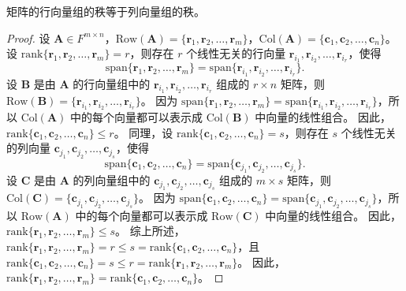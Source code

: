 \begin{proposition}
    矩阵的行向量组的秩等于列向量组的秩。
    \label{prop:row_col_rank}
\end{proposition}
\begin{proof}
    设 $\mathbf{A} \in F^{m \times n}$，$\mathrm{Row}(\mathbf{A}) = \{\mathbf{r}_1,\mathbf{r}_2,\ldots,\mathbf{r}_m\}$，$\mathrm{Col}(\mathbf{A}) = \{\mathbf{c}_1,\mathbf{c}_2,\ldots,\mathbf{c}_n\}$。
    设 $\mathrm{rank}\{\mathbf{r}_1,\mathbf{r}_2,\ldots,\mathbf{r}_m\} = r$，则存在 $r$ 个线性无关的行向量 $\mathbf{r}_{i_1},\mathbf{r}_{i_2},\ldots,\mathbf{r}_{i_r}$，使得
    \[
        \mathrm{span}\{\mathbf{r}_1,\mathbf{r}_2,\ldots,\mathbf{r}_m\} = \mathrm{span}\{\mathbf{r}_{i_1},\mathbf{r}_{i_2},\ldots,\mathbf{r}_{i_r}\}.
    \]
    设 $\mathbf{B}$ 是由 $\mathbf{A}$ 的行向量组中的 $\mathbf{r}_{i_1},\mathbf{r}_{i_2},\ldots,\mathbf{r}_{i_r}$ 组成的 $r \times n$ 矩阵，则 $\mathrm{Row}(\mathbf{B}) = \{\mathbf{r}_{i_1},\mathbf{r}_{i_2},\ldots,\mathbf{r}_{i_r}\}$。
    因为 $\mathrm{span}\{\mathbf{r}_1,\mathbf{r}_2,\ldots,\mathbf{r}_m\} = \mathrm{span}\{\mathbf{r}_{i_1},\mathbf{r}_{i_2},\ldots,\mathbf{r}_{i_r}\}$，所以 $\mathrm{Col}(\mathbf{A})$ 中的每个向量都可以表示成 $\mathrm{Col}(\mathbf{B})$ 中向量的线性组合。
    因此，$\mathrm{rank}\{\mathbf{c}_1,\mathbf{c}_2,\ldots,\mathbf{c}_n\} \leq r$。
    同理，设 $\mathrm{rank}\{\mathbf{c}_1,\mathbf{c}_2,\ldots,\mathbf{c}_n\} = s$，则存在 $s$ 个线性无关的列向量 $\mathbf{c}_{j_1},\mathbf{c}_{j_2},\ldots,\mathbf{c}_{j_s}$，使得
    \[
        \mathrm{span}\{\mathbf{c}_1,\mathbf{c}_2,\ldots,\mathbf{c}_n\} = \mathrm{span}\{\mathbf{c}_{j_1},\mathbf{c}_{j_2},\ldots,\mathbf{c}_{j_s}\}.
    \]
    设 $\mathbf{C}$ 是由 $\mathbf{A}$ 的列向量组中的 $\mathbf{c}_{j_1},\mathbf{c}_{j_2},\ldots,\mathbf{c}_{j_s}$ 组成的 $m \times s$ 矩阵，则 $\mathrm{Col}(\mathbf{C}) = \{\mathbf{c}_{j_1},\mathbf{c}_{j_2},\ldots,\mathbf{c}_{j_s}\}$。
    因为 $\mathrm{span}\{\mathbf{c}_1,\mathbf{c}_2,\ldots,\mathbf{c}_n\} = \mathrm{span}\{\mathbf{c}_{j_1},\mathbf{c}_{j_2},\ldots,\mathbf{c}_{j_s}\}$，所以 $\mathrm{Row}(\mathbf{A})$ 中的每个向量都可以表示成 $\mathrm{Row}(\mathbf{C})$ 中向量的线性组合。
    因此，$\mathrm{rank}\{\mathbf{r}_1,\mathbf{r}_2,\ldots,\mathbf{r}_m\} \leq s$。
    综上所述，$\mathrm{rank}\{\mathbf{r}_1,\mathbf{r}_2,\ldots,\mathbf{r}_m\} = r \leq s = \mathrm{rank}\{\mathbf{c}_1,\mathbf{c}_2,\ldots,\mathbf{c}_n\}$，且 $\mathrm{rank}\{\mathbf{c}_1,\mathbf{c}_2,\ldots,\mathbf{c}_n\} = s \leq r = \mathrm{rank}\{\mathbf{r}_1,\mathbf{r}_2,\ldots,\mathbf{r}_m\}$。
    因此，$\mathrm{rank}\{\mathbf{r}_1,\mathbf{r}_2,\ldots,\mathbf{r}_m\} = \mathrm{rank}\{\mathbf{c}_1,\mathbf{c}_2,\ldots,\mathbf{c}_n\}$。
\end{proof}

